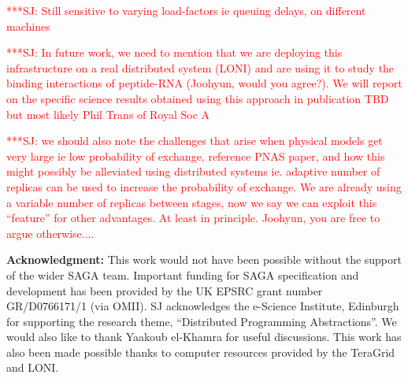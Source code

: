 \documentclass{rspublic}
\newcommand{\jhanote}[1]{ {\textcolor{red} { ***SJ: #1 }}}
\newcommand{\jhanote}[1]{}
\begin{document}
\jhanote{Still sensitive to varying load-factors ie queuing delays, on
  different machines}

\jhanote{In future work, we need to mention that we are deploying this
  infrastructure on a real distributed system (LONI) and are using it
  to study the binding interactions of peptide-RNA (Joohyun, would you
  agree?). We will report on the specific science results obtained
  using this approach in publication TBD but most likely Phil Trans of
  Royal Soc A}

\jhanote{we should also note the challenges that arise when physical
  models get very large ie low probability of exchange, reference PNAS
  paper, and how this might possibly be alleviated using distributed
  systems ie. adaptive number of replicas can be used to increase the
  probability of exchange. We are already using a variable number of
  replicas between stages, now we say we can exploit this ``feature''
  for other advantages. At least in principle.  Joohyun, you are free
  to argue otherwise....}

\vspace{0.1in}
\noindent
{\bf Acknowledgment:} This work would not have been possible without the support of 
	  the wider SAGA team. Important funding for SAGA
	  specification and development has been provided by the UK EPSRC
	  grant number GR/D0766171/1 (via OMII).  SJ acknowledges the
	  e-Science Institute, Edinburgh for supporting the research theme,
	  ``Distributed Programming Abstractions''.  We would also like to
	  thank Yaakoub el-Khamra for useful discussions. This work has also
	  been made possible thanks to computer resources provided by the
	  TeraGrid and LONI.        


    
\end{document}
